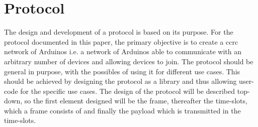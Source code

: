 \section{Protocol}
The design and development of a protocol is based on its purpose.
For the protocol documented in this paper, the primary objective is to create a \acrlong{ccrc} network of Arduinos i.e. a network of Arduinos able to communicate with an arbitrary number of devices and allowing devices to join.
The protocol should be general in purpose, with the possibles of using it for different use cases.
This should be achieved by designing the protocol as a library and thus allowing user-code for the specific use cases.
The design of the protocol will be described top-down, so the first element designed will be the frame, thereafter the time-slots, which a frame consists of and finally the payload which is transmitted in the time-slots. 
